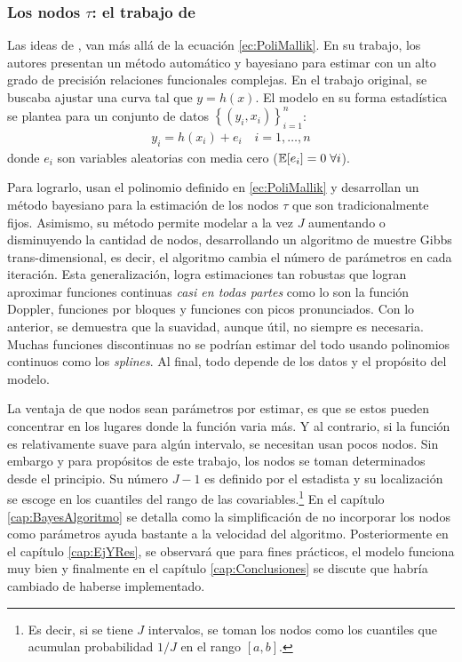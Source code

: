 \documentclass[../Main/Main.tex]{subfiles}
\begin{document}
\subsubsection*{Los nodos $\tau$: el trabajo de \citeauthor{mallik1998automatic}}
Las ideas de \citet{mallik1998automatic}, van más allá de la ecuación \eqref{ec:PoliMallik}. En su trabajo, los autores presentan un método automático y bayesiano para estimar con un alto grado de precisión relaciones funcionales complejas. En el trabajo original, se buscaba ajustar una curva tal que $y = h(x)$. El modelo en su forma estadística se plantea para un conjunto de datos $\left\{(y_i,x_i) \right\}_{i = 1}^n$:
\begin{align}
	y_i = h(x_i) + e_i \quad i = 1,\ldots,n
\end{align}
donde $e_i$ son variables aleatorias con media cero ($\mathbb{E}[e_i] = 0 \; \forall i$).  

Para lograrlo, usan el polinomio definido en \eqref{ec:PoliMallik} y desarrollan un método bayesiano para la estimación de los nodos $\tau$ que son tradicionalmente fijos. Asimismo, su método permite modelar a la vez $J$ aumentando o disminuyendo la cantidad de nodos, desarrollando un algoritmo de muestre Gibbs trans-dimensional, es decir, el algoritmo cambia el número de parámetros en cada iteración. Esta generalización, logra estimaciones tan robustas que logran aproximar funciones continuas \textit{casi en todas partes} como lo son la función Doppler, funciones por bloques y funciones con picos pronunciados. Con lo anterior, se demuestra que la suavidad, aunque útil, no siempre es necesaria. Muchas funciones discontinuas no se podrían estimar del todo usando polinomios continuos como los \textit{splines}. Al final, todo depende de los datos y el propósito del modelo.

La ventaja de que nodos sean parámetros por estimar, es que se estos pueden concentrar en los lugares donde la función varia más. Y al contrario, si la función es relativamente suave para algún intervalo, se necesitan usan pocos nodos. Sin embargo y para propósitos de este trabajo, los nodos se toman determinados desde el principio. Su número $J-1$ es definido por el estadista y su localización se escoge en los cuantiles del rango de las covariables.\footnote{Es decir, si se tiene $J$ intervalos, se toman los nodos como los  cuantiles que acumulan probabilidad $1/J$ en el rango $[a,b]$.} En el capítulo \ref{cap:BayesAlgoritmo} se detalla como la simplificación de no incorporar los nodos como parámetros ayuda bastante a la velocidad del algoritmo. Posteriormente en el capítulo \ref{cap:EjYRes}, se observará que para fines prácticos, el modelo funciona muy bien y finalmente en el capítulo \ref{cap:Conclusiones} se discute que habría cambiado de haberse implementado. 
\end{document}
